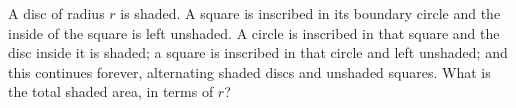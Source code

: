 A disc of radius $r$ is shaded. A square is inscribed in its boundary circle and the inside of the square is left unshaded. A circle is inscribed in that square and the disc inside it is shaded; a square is inscribed in that circle and left unshaded; and this continues forever, alternating shaded discs and unshaded squares. What is the total shaded area, in terms of $r$?

